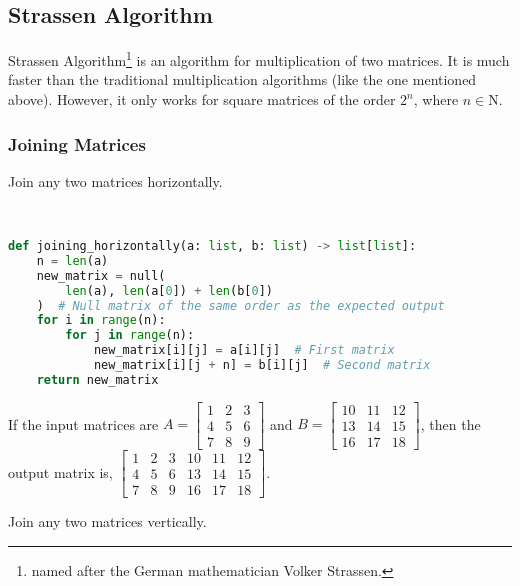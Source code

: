\subsection{Strassen Algorithm}
Strassen Algorithm\footnote{named after the German mathematician Volker Strassen.} is an algorithm for multiplication of two matrices. It is much faster than the traditional multiplication algorithms (like the one mentioned above). However, it only works for square matrices of the order $2^n$, where $n\in \mathrm{N}$.
\subsubsection{Joining Matrices}
\begin{eg}
	Join any two matrices horizontally.
\end{eg}
\begin{explanation}
	\phantom \\
	\begin{lstlisting}[language=Python]
def joining_horizontally(a: list, b: list) -> list[list]:
	n = len(a)
	new_matrix = null(
		len(a), len(a[0]) + len(b[0])
	)  # Null matrix of the same order as the expected output
	for i in range(n):
		for j in range(n):  
			new_matrix[i][j] = a[i][j]  # First matrix
			new_matrix[i][j + n] = b[i][j]  # Second matrix
	return new_matrix \end{lstlisting}
	If the input matrices are $A=\begin{bmatrix}
			1 & 2 & 3 \\
			4 & 5 & 6 \\
			7 & 8 & 9
		\end{bmatrix}$ and $B=\begin{bmatrix}
			10 & 11 & 12 \\
			13 & 14 & 15 \\
			16 & 17 & 18
		\end{bmatrix}$, then the output matrix is, $\begin{bmatrix}
			1 & 2 & 3 & 10 & 11 & 12 \\
			4 & 5 & 6 & 13 & 14 & 15 \\
			7 & 8 & 9 & 16 & 17 & 18
		\end{bmatrix}$.
\end{explanation}
\begin{eg}
	Join any two matrices vertically.
\end{eg}

